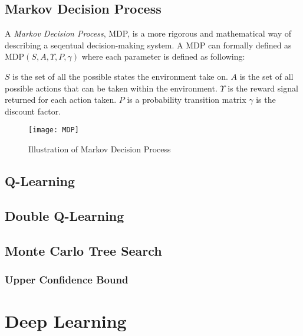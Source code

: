 \documentclass[titlepage]{article}
\begin{document}
\subsection{Markov Decision Process}

\vskip 0.2cm

A \emph{Markov Decision Process}, MDP, is a more rigorous and mathematical way of describing a seqentual decision-making system. A MDP can formally defined as MDP$(S, A, \Upsilon, P, \gamma)$ where each parameter is defined as following:

\vskip 0.3cm

\begin{outline}
    \1 $S$ is the set of all the possible states the environment take on.
    \1 $A$ is the set of all possible actions that can be taken within the environment.
    \1 $\Upsilon$ is the reward signal returned for each action taken.
    \1 $P$ is a probability transition matrix
    \1 $\gamma$ is the discount factor.
\end{outline}

\newpage

\begin{figure}[h]
    \centering
    \texttt{[image: MDP]}
    \caption{Illustration of Markov Decision Process}
\end{figure}



\newpage

\subsection{Q-Learning}

\subsection{Double Q-Learning}

\newpage

\subsection{Monte Carlo Tree Search}
\subsubsection{Upper Confidence Bound}

\newpage

\section{Deep Learning}
\end{document}
